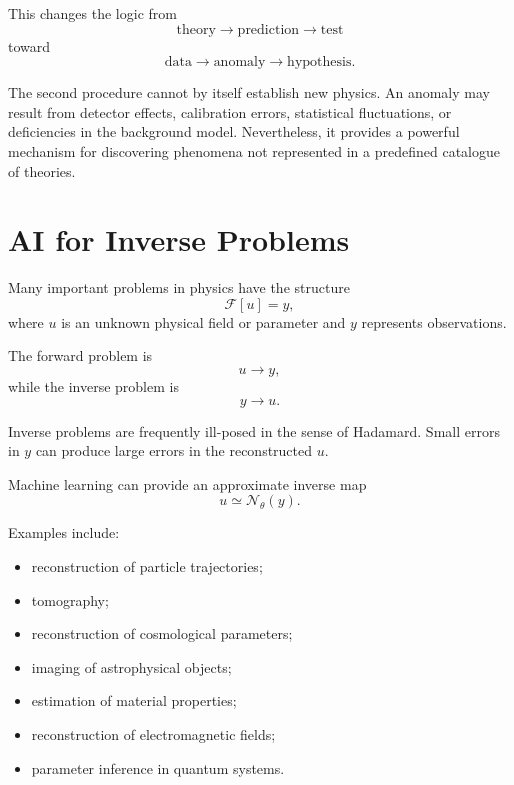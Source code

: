 \documentclass[11pt,a4paper]{article}
\begin{document}
This changes the logic from
\begin{equation}
\text{theory}\rightarrow\text{prediction}\rightarrow\text{test}
\end{equation}
toward
\begin{equation}
\text{data}\rightarrow\text{anomaly}\rightarrow\text{hypothesis}.
\end{equation}

The second procedure cannot by itself establish new physics. An anomaly may
result from detector effects, calibration errors, statistical fluctuations,
or deficiencies in the background model. Nevertheless, it provides a powerful
mechanism for discovering phenomena not represented in a predefined catalogue
of theories.

\section{AI for Inverse Problems}

Many important problems in physics have the structure
\begin{equation}
\mathcal{F}[u]=y,
\end{equation}
where $u$ is an unknown physical field or parameter and $y$ represents
observations.

The forward problem is
\begin{equation}
u\longrightarrow y,
\end{equation}
while the inverse problem is
\begin{equation}
y\longrightarrow u.
\end{equation}

Inverse problems are frequently ill-posed in the sense of Hadamard. Small
errors in $y$ can produce large errors in the reconstructed $u$.

Machine learning can provide an approximate inverse map
\begin{equation}
u\simeq \mathcal{N}_\theta(y).
\end{equation}

Examples include:

\begin{itemize}
\item reconstruction of particle trajectories;
\item tomography;
\item reconstruction of cosmological parameters;
\item imaging of astrophysical objects;
\item estimation of material properties;
\item reconstruction of electromagnetic fields;
\item parameter inference in quantum systems.
\end{itemize}
\end{document}
